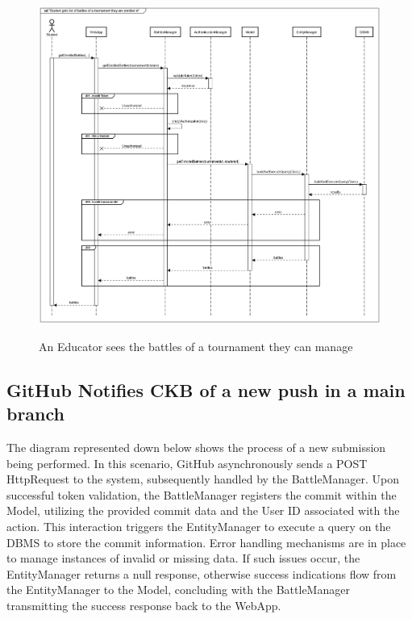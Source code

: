\documentclass{Configuration_Files/Template}
\begin{document}
\begin{figure}[H]
\centering
\includegraphics[scale = 0.33]{Images/diagrams/sequences/getCreatedBattles.png}\\
\caption{An Educator sees the battles of a tournament they can manage}
\end{figure}

\subsection*{GitHub Notifies CKB of a new push in a main branch}

The diagram represented down below shows the process of a new submission being performed. In this scenario, GitHub asynchronously sends a POST HttpRequest to the system, subsequently handled by the BattleManager. Upon successful token validation, the BattleManager registers the commit within the Model, utilizing the provided commit data and the User ID associated with the action. This interaction triggers the EntityManager to execute a query on the DBMS to store the commit information. Error handling mechanisms are in place to manage instances of invalid or missing data. If such issues occur, the EntityManager returns a null response, otherwise success indications flow from the EntityManager to the Model, concluding with the BattleManager transmitting the success response back to the WebApp. 
\end{document}
